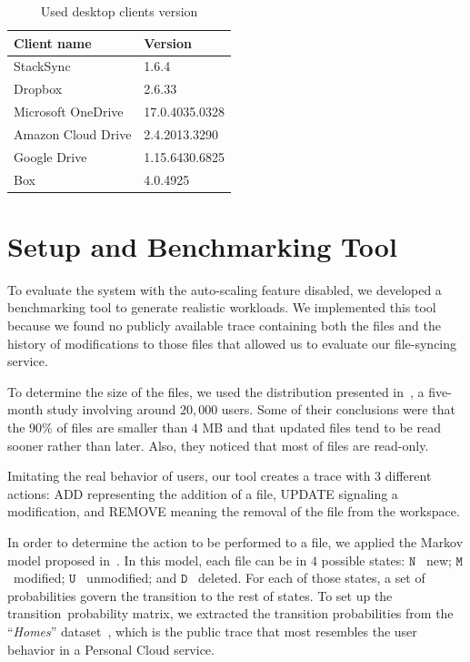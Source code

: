 \begin{table}
    \centering
    \begin{tabular}{ | l | l | }
    \hline
    Client name & Version \\ \hline
    StackSync & 1.6.4 \\
    Dropbox & 2.6.33 \\
    Microsoft OneDrive & 17.0.4035.0328 \\
    Amazon Cloud Drive & 2.4.2013.3290 \\ 
    Google Drive & 1.15.6430.6825 \\ 
    Box & 4.0.4925 \\ \hline
    \end{tabular}
    \caption{Used desktop clients version}
    \label{table:clients}
\end{table}

\section{Setup and Benchmarking Tool}

To evaluate the system with the auto-scaling feature disabled, we developed a benchmarking tool to generate
realistic workloads. We implemented this tool because we found no publicly available trace containing both 
the files and the history of modifications to those files that allowed us to evaluate our file-syncing service.

To determine the size of the files, we used the distribution presented in~\cite{liu2013},
a five-month study involving around $20,000$ users. Some of their conclusions
were that the $90\%$ of files are smaller than $4$ MB and that updated files tend to be read sooner
rather than later. Also, they noticed that most of files are read-only.

Imitating the real behavior of users, our tool creates a trace with $3$ different actions: ADD representing the addition
of a file, UPDATE signaling a modification, and REMOVE meaning the removal of the file from the workspace.

In order to determine the action to be performed to a file, we applied the Markov model proposed in~\cite{Tarasov12}. 
In this model, each file can be in $4$ possible states: $\mathtt{N}$ \textemdash~new; $\mathtt{M} $\textemdash~modified; 
$\mathtt{U}$ \textemdash~unmodified; and $\mathtt{D}$ \textemdash~deleted.
For each of those states, a set of probabilities govern the transition to the rest of states.
To set up the transition~probability
matrix, we extracted the transition probabilities from the ``\textit{Homes}'' dataset~\cite{Tarasov12}, 
which is the public trace that most resembles the user behavior in a Personal Cloud service.

